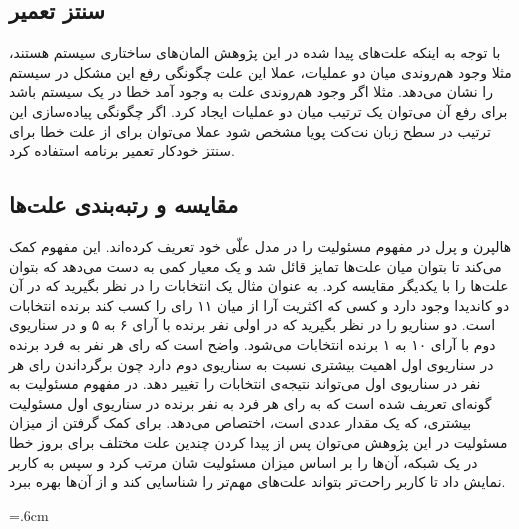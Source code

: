 \documentclass[
msc,
irfonts
]{./tex/tehran-thesis}
\newcommand{\پ}{پروژه/پایان‌نامه/رساله }
\theoremstyle{definition}
\theoremstyle{theorem}
\theoremstyle{definition}
\numberwithin{algorithm}{chapter}
\newlength\mylenapp
\renewcommand\cftchappresnum{\chaptername~}
\newcommand{\lf}[1]{\LTRfootnote{#1}}
\begin{document}
\subsection{سنتز تعمیر}
با توجه به اینکه علت‌های پیدا شده در این پژوهش المان‌های ساختاری سیستم هستند، مثلا وجود هم‌روندی میان دو عملیات، عملا این علت چگونگی رفع این مشکل در سیستم‌ را نشان می‌دهد. مثلا اگر وجود هم‌روندی علت به وجود آمد خطا در یک سیستم باشد برای رفع آن می‌توان یک ترتیب میان دو عملیات ایجاد کرد.
اگر چگونگی پیاده‌سازی این ترتیب در سطح زبان نت‌کت پویا مشخص شود عملا می‌توان برای از علت خطا برای سنتز خودکار تعمیر برنامه استفاده کرد.

\subsection{مقایسه و رتبه‌بندی علت‌ها}
هالپرن و پرل در 
\cite{hp2}
مفهوم مسئولیت\lf{Responsibility}
را در مدل علّی خود تعریف کرده‌اند.
این مفهوم کمک می‌کند تا بتوان میان علت‌ها تمایز قائل شد و یک معیار کمی به دست می‌دهد که بتوان علت‌ها را با یکدیگر مقایسه کرد.
به عنوان مثال یک انتخابات را در نظر بگیرید که در آن دو کاندیدا وجود دارد و کسی که اکثریت آرا از میان ۱۱ رای را کسب کند برنده انتخابات است. 
دو سناریو را در نظر بگیرید که در اولی نفر برنده با آرای ۶ به ۵ و در سناریوی دوم با آرای ۱۰ به ۱ برنده انتخابات می‌شود.
واضح است که رای هر نفر به فرد برنده در سناریوی اول اهمیت بیشتری نسبت به سناریوی دوم دارد چون برگرداندن رای هر نفر در سناریوی اول می‌تواند نتیجه‌ی انتخابات را تغییر دهد.
در
\cite{hp2}
مفهوم مسئولیت به گونه‌ای تعریف شده است که به رای هر فرد به نفر برنده در سناریوی‌ اول مسئولیت بیشتری، که یک مقدار عددی است، 
اختصاص می‌دهد.
برای کمک گرفتن از میزان مسئولیت در این پژوهش می‌توان پس از پیدا کردن چندین علت مختلف برای بروز خطا در یک شبکه، آن‌ها را بر اساس میزان مسئولیت شان مرتب کرد و سپس به کاربر نمایش داد تا کاربر راحت‌تر بتواند علت‌های مهم‌تر را شناسایی کند و از آن‌ها بهره ببرد.\clearpage{}

\pagestyle{empty}
{
    \small
    \onehalfspacing
      }

\pagestyle{fancy}

\addtocontents{toc}{
    \protect\renewcommand\protect\cftchappresnum{\appendixname~}\protect\setlength{\cftchapnumwidth}{\mylenapp}}




\onehalfspacing
\cleardoublepage
\printindex

\begin{latin}
    \baselineskip=.6cm
    \latinabstract
    \latinTitlePage
\end{latin}
\label{LastPage}
\end{document}
